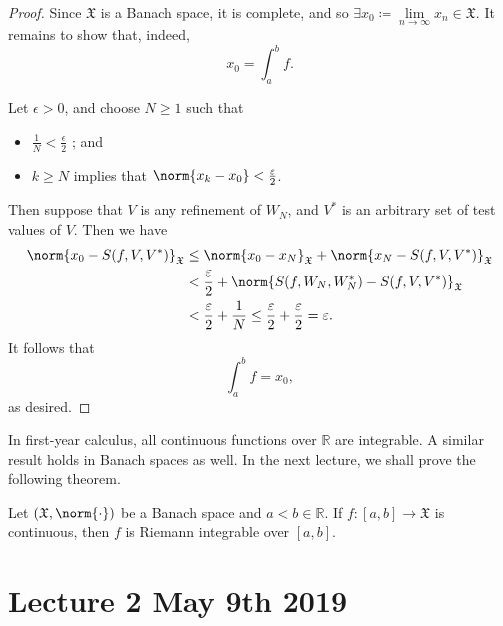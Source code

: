 \documentclass[notoc,notitlepage]{tufte-book}
\begin{document}
\begin{proof}
  Since $\mathfrak{X}$ is a Banach space, it is complete, and so $\exists x_0
  \coloneqq \lim\limits_{n \to \infty} x_n \in \mathfrak{X}$. It remains to show
  that, indeed,
  \begin{equation*}
    x_0 = \int_{a}^{b} f.
  \end{equation*}

  Let $\epsilon > 0$, and choose $N \geq 1$ such that
  \begin{itemize}
    \item $\frac{1}{N} < \frac{\epsilon}{2}$ ; and
    \item $k \geq N$ implies that $\norm{x_k - x_0} < \frac{\epsilon}{2}$.
  \end{itemize}
  Then suppose that $V$ is any refinement of $W_N$, and $V^*$ is an arbitrary
  set of test values of $V$. Then we have
  \begin{align*}
    \norm{x_0 - S(f,V,V^*)}_{\mathfrak{X}}
    &\leq \norm{x_0 - x_N}_{\mathfrak{X}} + \norm{x_N -
      S(f,V,V^*)}_{\mathfrak{X}} \\
    &< \frac{\epsilon}{2} + \norm{S(f,W_N,W_N^*) - S(f,V,V^*)}_{\mathfrak{X}} \\
    &<\frac{\epsilon}{2} + \frac{1}{N} \leq \frac{\epsilon}{2} +
    \frac{\epsilon}{2} = \epsilon.
  \end{align*}
  It follows that
  \begin{equation*}
    \int_{a}^{b} f = x_0,
  \end{equation*}
  as desired.
\end{proof}

In first-year calculus, all continuous functions over $\mathbb{R}$ are
integrable. A similar result holds in Banach spaces as well.
In the next lecture, we shall prove the following theorem.

\begin{thmnonum}
  Let $(\mathfrak{X}, \norm{\cdot})$ be a Banach space and $a < b \in
  \mathbb{R}$. If $f : [a, b] \to \mathfrak{X}$ is continuous, then $f$ is
  Riemann integrable over $[a, b]$.
\end{thmnonum}



\chapter{Lecture 2 May 9th 2019}%
\label{chp:lecture_2_may_9th_2019}
\end{document}
